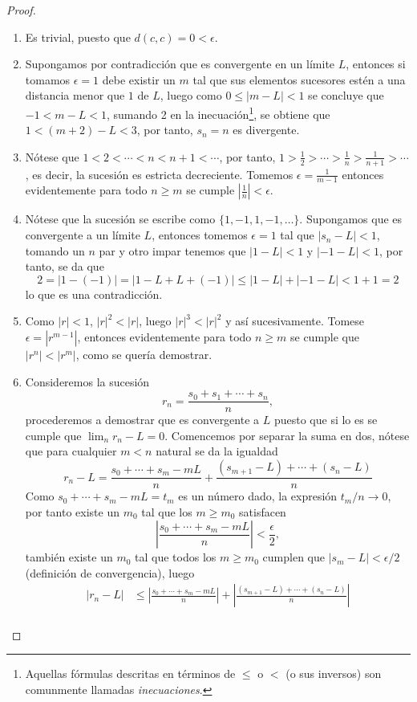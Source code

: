 \documentclass[11pt,oneside,a4paper]{book}
\begin{document}
\begin{proof}
\begin{enumerate}[$a$)]
\item Es trivial, puesto que $d(c,c)=0\lt\epsilon$.
\item Supongamos por contradicción que es convergente en un límite $L$, entonces si tomamos $\epsilon=1$ debe existir un $m$ tal que sus elementos sucesores estén a una distancia menor que $1$ de $L$, luego como $0\leq|m-L|\lt 1$ se concluye que $-1\lt m-L\lt 1$, sumando 2 en la inecuación\footnote{Aquellas fórmulas descritas en términos de $\leq$ o $\lt$ (o sus inversos) son comunmente llamadas \textit{inecuaciones}.}, se obtiene que $1\lt(m+2)-L\lt3$, por tanto, $s_n=n$ es divergente.
\item Nótese que $1\lt2\lt\cdots\lt n\lt n+1\lt\cdots$, por tanto, $1\gt\frac{1}{2}\gt\cdots\gt\frac{1}{n}\gt\frac{1}{n+1}\gt\cdots$, es decir, la sucesión es estricta decreciente. Tomemos $\epsilon=\frac{1}{m-1}$ entonces evidentemente para todo $n\geq m$ se cumple $|\frac{1}{n}|\lt\epsilon$.
\item Nótese que la sucesión se escribe como $\{1,-1,1,-1,\dots\}$. Supongamos que es convergente a un límite $L$, entonces tomemos $\epsilon=1$ tal que $|s_n-L|\lt 1$, tomando un $n$ par y otro impar tenemos que $|1-L|\lt 1$ y $|-1-L|\lt 1$, por tanto, se da que
$$2=|1-(-1)|=|1-L+L+(-1)|\leq|1-L|+|-1-L|\lt 1+1=2$$
lo que es una contradicción.
\item Como $|r|\lt 1$, $|r|^2\lt|r|$, luego $|r|^3\lt|r|^2$ y así sucesivamente. Tomese $\epsilon=|r^{m-1}|$, entonces evidentemente para todo $n\geq m$ se cumple que $|r^n|\lt|r^m|$, como se quería demostrar.
\item Consideremos la sucesión
$$r_n=\frac{s_0+s_1+\cdots+s_n}{n},$$
procederemos a demostrar que es convergente a $L$ puesto que si lo es se cumple que $\lim_n r_n-L=0$. Comencemos por separar la suma en dos, nótese que para cualquier $m\lt n$ natural se da la igualdad
$$r_n-L=\frac{s_0+\cdots+s_m-mL}{n}+\frac{(s_{m+1}-L)+\cdots+(s_n-L)}{n}$$
Como $s_0+\cdots+s_m-mL=t_m$ es un número dado, la expresión $t_m/n\to 0$, por tanto existe un $m_0$ tal que los $m\geq m_0$ satisfacen
$$\left|\frac{s_0+\cdots+s_m-mL}{n}\right|\lt\frac{\epsilon}{2},$$
también existe un $m_0$ tal que todos los $m\geq m_0$ cumplen que $|s_m-L|\lt\epsilon/2$ (definición de convergencia), luego
\begin{align*}
|r_n-L|&\leq\left|\frac{s_0+\cdots+s_m-mL}{n}\right|+\left|\frac{(s_{m+1}-L)+\cdots+(s_n-L)}{n}\right|\\

\end{align*}
\end{enumerate}
\end{proof}
\end{document}

